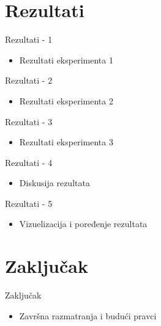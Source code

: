 \documentclass{beamer}
\begin{document}
\section{Rezultati}
\begin{frame}{Rezultati - 1}
    \begin{itemize}
        \item Rezultati eksperimenta 1
    \end{itemize}
\end{frame}

\begin{frame}{Rezultati - 2}
    \begin{itemize}
        \item Rezultati eksperimenta 2
    \end{itemize}
\end{frame}

\begin{frame}{Rezultati - 3}
    \begin{itemize}
        \item Rezultati eksperimenta 3
    \end{itemize}
\end{frame}

\begin{frame}{Rezultati - 4}
    \begin{itemize}
        \item Diskusija rezultata
    \end{itemize}
\end{frame}

\begin{frame}{Rezultati - 5}
    \begin{itemize}
        \item Vizuelizacija i poređenje rezultata
    \end{itemize}
\end{frame}

\section{Zaključak}
\begin{frame}{Zaključak}
    \begin{itemize}
        \item Završna razmatranja i budući pravci
    \end{itemize}
\end{frame}


\end{document}
